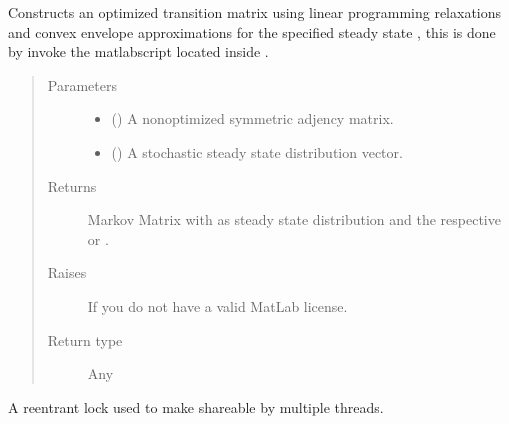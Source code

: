 \documentclass[letterpaper,10pt,english]{sphinxmanual}
\begin{document}
\begin{fulllineitems}
\begin{fulllineitems}
Constructs an optimized transition matrix using linear programming
relaxations and convex envelope approximations for the specified steady
state , this is done by invoke the matlabscript
 located inside
{\hyperref[\detokenize{app:app.environment_settings.MATLAB_DIR}]{}}.
\begin{quote}\begin{description}
\item[{Parameters}] \leavevmode\begin{itemize}
\item {} 
 () \textendash{} A non\sphinxhyphen{}optimized symmetric adjency matrix.

\item {} 
 () \textendash{} A stochastic steady state distribution vector.

\end{itemize}

\item[{Returns}] \leavevmode
Markov Matrix with  as steady state distribution and the
respective {\hyperref[\detokenize{app.domain.helpers:app.domain.helpers.matrices.get_mixing_rate}]{}} or .

\item[{Raises}] \leavevmode
{} \textendash{} If you do not have a valid MatLab license.

\item[{Return type}] \leavevmode
Any

\end{description}\end{quote}

\end{fulllineitems}


\begin{fulllineitems}
\label{\detokenize{app.domain.helpers:app.domain.helpers.matlab_utils.MatlabEngineContainer._LOCK}}
A re\sphinxhyphen{}entrant lock used to make  shareable by multiple threads.


\end{fulllineitems}
\end{fulllineitems}
\end{document}

